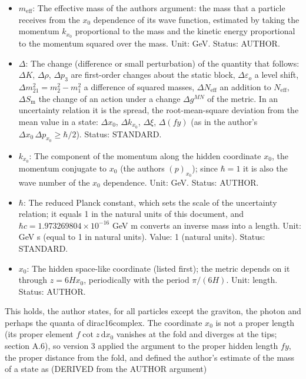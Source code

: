 \documentclass[
  10pt,
]{article}
\providecommand{\tightlist}{%
  \setlength{\itemsep}{0pt}\setlength{\parskip}{0pt}}
\begin{document}
\begin{itemize}
\tightlist
\item
  \(m_{\mathrm{eff}}\): The effective mass of the
  author\textquotesingle s argument: the mass that a particle receives
  from the \(x_0\) dependence of its wave function, estimated by taking
  the momentum \(k_{x_0}\) proportional to the mass and the kinetic
  energy proportional to the momentum squared over the mass. Unit: GeV.
  Status: AUTHOR.
\item
  \(\Delta\): The change (difference or small perturbation) of the
  quantity that follows: \(\Delta K\), \(\Delta\rho\), \(\Delta p_3\)
  are first-order changes about the static block,
  \(\Delta\varepsilon_o\) a level shift,
  \(\Delta m^2_{21} = m_2^2 - m_1^2\) a difference of squared masses,
  \(\Delta N_{\mathrm{eff}}\) an addition to \(N_{\mathrm{eff}}\),
  \(\Delta S_{\mathrm{m}}\) the change of an action under a change
  \(\Delta g^{MN}\) of the metric. In an uncertainty relation it is the
  spread, the root-mean-square deviation from the mean value in a state:
  \(\Delta x_0\), \(\Delta k_{x_0}\), \(\Delta\xi\), \(\Delta(fy)\) (as
  in the author's \(\Delta x_0\,\Delta p_{x_0} \ge \hbar/2\)). Status:
  STANDARD.
\item
  \(k_{x_0}\): The component of the momentum along the hidden coordinate
  \(x_0\), the momentum conjugate to \(x_0\) (the
  author\textquotesingle s \((p)_{x_0}\)); since \(\hbar = 1\) it is
  also the wave number of the \(x_0\) dependence. Unit: GeV. Status:
  AUTHOR.
\item
  \(\hbar\): The reduced Planck constant, which sets the scale of the
  uncertainty relation; it equals 1 in the natural units of this
  document, and \(\hbar c = 1.973269804\times10^{-16}\) GeV m converts
  an inverse mass into a length. Unit: GeV s (equal to 1 in natural
  units). Value: 1 (natural units). Status: STANDARD.
\item
  \(x_0\): The hidden space-like coordinate (listed first); the metric
  depends on it through \(z = 6Hx_0\), periodically with the period
  \(\pi/(6H)\). Unit: length. Status: AUTHOR.
\end{itemize}

This holds, the author states, for all particles except the graviton,
the photon and perhaps the quanta of dirac16complex. The coordinate
\(x_0\) is not a proper length (its proper element
\(f\cot z\,\mathrm{d}x_0\) vanishes at the fold and diverges at the
tips; section A.6), so version 3 applied the argument to the proper
hidden length \(fy\), the proper distance from the fold, and defined the
author's estimate of the mass of a state as (DERIVED from the AUTHOR
argument)
\end{document}
